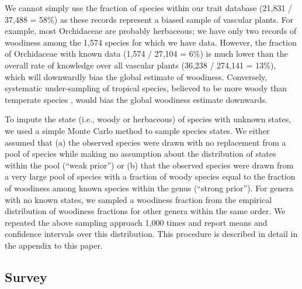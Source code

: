 \documentclass[12pt]{article}
\begin{document}
We cannot simply use the fraction of species within our trait database
(21,831 / 37,488 = 58\%) as these records represent a biased sample of
vascular plants.
For example, most Orchidaceae are probably herbaceous; we have only
two records of woodiness among the 1,574 species for which we have
data.
However, the fraction of Orchidaceae with known data (1,574 / 27,104 =
6\%)
is much lower than the overall rate of knowledge over all vascular
plants (36,238 / 274,141 = 13\%), which will downwardly bias the
global estimate of woodiness.
%
Conversely, systematic under-sampling of tropical species, believed to
be more woody than temperate species \citep{Molesheihgt}, would bias
the global woodiness estimate downwards.

To impute the state (i.e., woody or herbaceous) of species with
unknown states, we used a simple Monte Carlo method to sample species
states.  We either assumed that (a) the observed species were drawn
with no replacement from a pool of species while making no assumption
about the distribution of states within the pool (``weak prior'') or
(b) that the observed species were drawn from a very large pool of
species with a fraction of woody species equal to the fraction of
woodiness among known species within the genus (``strong prior'').
%
For genera with no known states, we sampled a woodiness fraction from
the empirical distribution of woodiness fractions for other genera
within the same order.
%
We repeated the above sampling approach 1,000 times and report means
and confidence intervals over this distribution.
%
This procedure is described in detail in the appendix to this paper.

\subsection{Survey}
\end{document}

